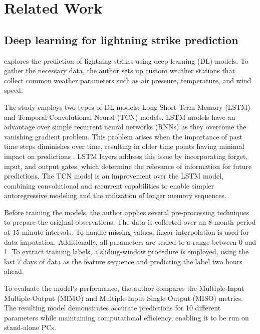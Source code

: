 \chapter{Related Work}
\label{sec:relatedwork}

\section{Deep learning for lightning strike prediction}

\textcite{bib5} explores the prediction of lightning strikes using deep learning (DL) models. To gather the necessary data, the author sets up custom weather stations that collect common weather parameters such as air pressure, temperature, and wind speed.

The study employs two types of DL models: Long Short-Term Memory (LSTM) and Temporal Convolutional Neural (TCN) models. LSTM models have an advantage over simple recurrent neural networks (RNNs) as they overcome the vanishing gradient problem. This problem arises when the importance of past time steps diminishes over time, resulting in older time points having minimal impact on predictions \cite{rnn-vanishing-gradient}. LSTM layers address this issue by incorporating forget, input, and output gates, which determine the relevance of information for future predictions. The TCN model is an improvement over the LSTM model, combining convolutional and recurrent capabilities to enable simpler autoregressive modeling and the utilization of longer memory sequences.

Before training the models, the author applies several pre-processing techniques to prepare the original observations. The data is collected over an 8-month period at 15-minute intervals. To handle missing values, linear interpolation is used for data imputation. Additionally, all parameters are scaled to a range between 0 and 1. To extract training labels, a sliding-window procedure is employed, using the last 7 days of data as the feature sequence and predicting the label two hours ahead.

To evaluate the model's performance, the author compares the Multiple-Input Multiple-Output (MIMO) and Multiple-Input Single-Output (MISO) metrics. The resulting model demonstrates accurate predictions for 10 different parameters while maintaining computational efficiency, enabling it to be run on stand-alone PCs.


